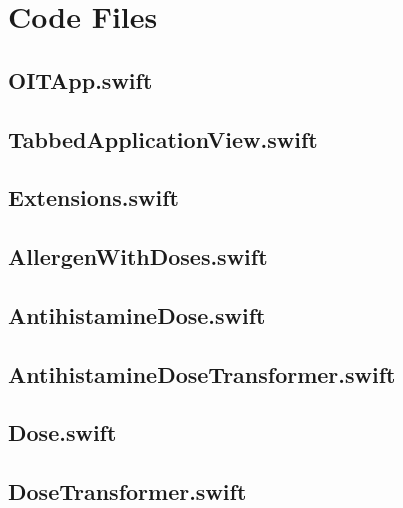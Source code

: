 \appendix
\chapter{Code Files}

\section{OITApp.swift}


\section{TabbedApplicationView.swift}


\section{Extensions.swift}


\section{AllergenWithDoses.swift}


\section{AntihistamineDose.swift}


\section{AntihistamineDoseTransformer.swift}


\section{Dose.swift}


\section{DoseTransformer.swift}


